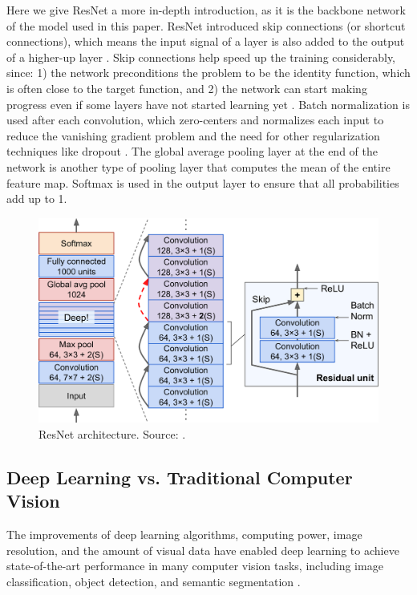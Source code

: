 \documentclass[a4paper, 11pt, oneside]{article}
\begin{document}
Here we give ResNet a more in-depth introduction, as it is the backbone network of the model used in this paper.
ResNet introduced skip connections (or shortcut connections), which means the input signal of a layer is also added to the
output of a higher-up layer \cite{geron2019hands, he2016deep}. Skip connections help speed up the training considerably,
since: 1) the network preconditions the problem to be the identity function, which is often close to the target function,
and 2) the network can start making progress even if some layers have not started learning yet
\cite{geron2019hands, he2016deep}. Batch normalization \cite{ioffe2015batch} is used after each convolution, which
zero-centers and normalizes each input to reduce the vanishing gradient problem \cite{hochreiter1998vanishing} and the
need for other regularization techniques like dropout \cite{srivastava2014dropout}. The global average pooling layer
at the end of the network is another type of pooling layer that computes the mean of the entire feature map. Softmax
is used in the output layer to ensure that all probabilities add up to 1.

\begin{figure}[ht]
  \begin{center}
    \includegraphics[width=.8\textwidth]{resnet.png}
  \end{center}
  \caption{ResNet architecture. Source: \cite{geron2019hands}.}
\end{figure}

\subsection{Deep Learning vs. Traditional Computer Vision}

\label{sec:dlvscv}

The improvements of deep learning algorithms, computing power, image resolution, and the amount of visual data have
enabled deep learning to achieve state-of-the-art performance in many computer vision tasks, including image
classification, object detection, and semantic segmentation \cite{qin2015underwater, voulodimos2018deep, o2019deep}.
\end{document}
